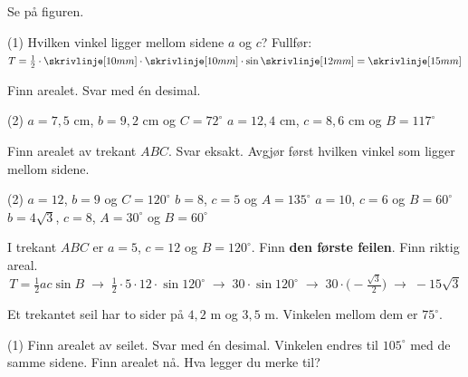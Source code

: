 Se på figuren.\par
\begin{minipage}[t]{0.40\linewidth}
\end{minipage}\hfill
\begin{minipage}[t]{0.56\linewidth}
\begin{tasks}(1)
  \task Hvilken vinkel ligger mellom sidene $a$ og $c$?
  \task Fullfør: $T = \frac12 \cdot \skrivlinje[10mm] \cdot \skrivlinje[10mm] \cdot \sin \skrivlinje[12mm] = \skrivlinje[15mm]$
\end{tasks}
\end{minipage}

Finn arealet. Svar med én desimal.
\begin{tasks}(2)
  \task $a = 7{,}5$ cm, $b = 9{,}2$ cm og $C = 72^\circ$
  \task $a = 12{,}4$ cm, $c = 8{,}6$ cm og $B = 117^\circ$
\end{tasks}


Finn arealet av trekant $ABC$. Svar eksakt. Avgjør først hvilken vinkel som ligger mellom sidene.
\begin{tasks}(2)
  \task $a = 12$, $b = 9$ og $C = 120^\circ$
  \task $b = 8$, $c = 5$ og $A = 135^\circ$
  \task $a = 10$, $c = 6$ og $B = 60^\circ$
  \task $b = 4\sqrt3$, $c = 8$, $A = 30^\circ$ og $B = 60^\circ$
\end{tasks}

I trekant $ABC$ er $a = 5$, $c = 12$ og $B = 120^\circ$. Finn \textbf{den første feilen}. Finn riktig areal.
\[ T = \tfrac12 ac\sin B \;\to\; \tfrac12\cdot 5\cdot 12\cdot\sin 120^\circ \;\to\; 30\cdot\sin 120^\circ \;\to\; 30\cdot\bigl(-\tfrac{\sqrt3}{2}\bigr) \;\to\; -15\sqrt3 \]

Et trekantet seil har to sider på $4{,}2$ m og $3{,}5$ m. Vinkelen mellom dem er $75^\circ$.
\begin{tasks}(1)
  \task Finn arealet av seilet. Svar med én desimal.
  \task Vinkelen endres til $105^\circ$ med de samme sidene. Finn arealet nå. Hva legger du merke til?
\end{tasks}


